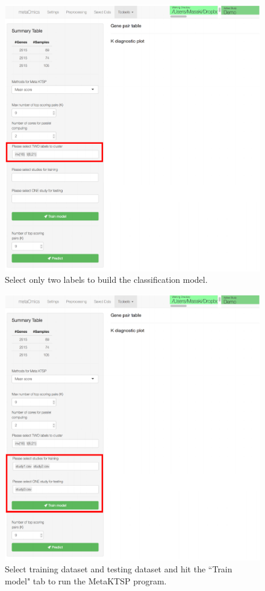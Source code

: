 \documentclass{article}
\begin{document}
\begin{figure}[H]
\begin{center}
\includegraphics[scale=0.7]{./figure/MetaKTSP/Figure7.pdf}
\caption{Select only two labels to build the classification model.}
\label{fig:TwoLabels}
\end{center}
\end{figure}

\begin{figure}[H]
\begin{center}
\includegraphics[scale=0.7]{./figure/MetaKTSP/Figure8.pdf}
\caption{Select training dataset and testing dataset and hit the ``Train model" tab to run the MetaKTSP program.}
\label{fig:TrainTest}
\end{center}
\end{figure}
\end{document}
